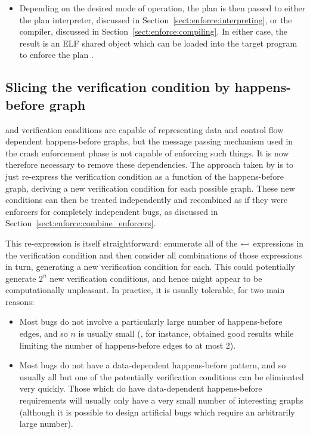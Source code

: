 \begin{itemize}
\item
  Depending on the desired mode of operation, the plan is then passed
  to either the plan interpreter, discussed in
  Section~\ref{sect:enforce:interpreting}, or the compiler, discussed
  in Section~\ref{sect:enforce:compiling}.  In either case, the result
  is an ELF shared object which can be loaded into the target program
  to enforce the plan .
\end{itemize}

\subsection{Slicing the verification condition by happens-before graph}
\label{sect:enforce:slice_hb_graph}


{\STateMachines} and verification conditions are capable of
representing data and control flow dependent happens-before graphs,
but the message passing mechanism used in the crash enforcement phase
is not capable of enforcing such things.  It is now therefore
necessary to remove these dependencies.  The approach taken by
{\implementation} is to just re-express the verification condition as
a function of the happens-before graph, deriving a new verification
condition for each possible graph.  These new conditions can then be
treated independently and recombined as if they were enforcers for
completely independent bugs, as discussed in
Section~\ref{sect:enforce:combine_enforcers}.

This re-expression is itself straightforward: enumerate all of the
$\leftarrowtail$ expressions in the verification condition and then
consider all combinations of those expressions in turn, generating a
new verification condition for each.  This could potentially generate
$2^n$ new verification conditions, and hence might appear to be
computationally unpleasant.  In practice, it is usually tolerable, for
two main reasons:

\begin{itemize}
\item
  Most bugs do not involve a particularly large number of
  happens-before edges, and so $n$ is usually small (, for instance, obtained good
  results while limiting the number of happens-before edges to at most
  2).
\item
  Most bugs do not have a data-dependent happens-before pattern, and
  so usually all but one of the potentially verification conditions
  can be eliminated very quickly.  Those which do have data-dependent
  happens-before requirements will usually only have a very small
  number of interesting graphs (although it is possible to design
  artificial bugs which require an arbitrarily large number).
\end{itemize}


